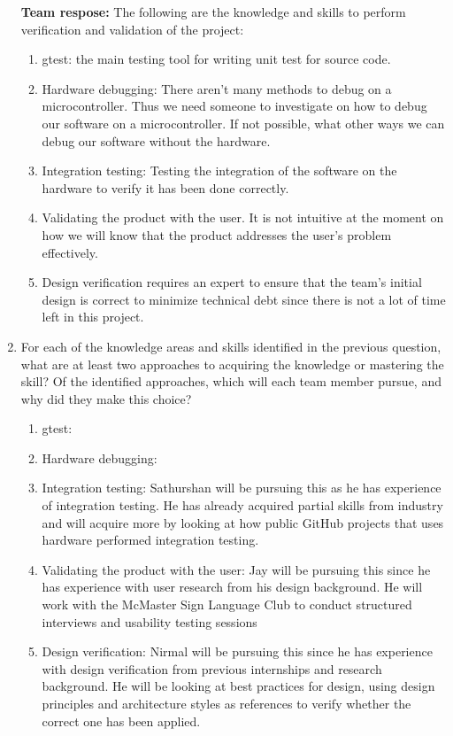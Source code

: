 \documentclass[12pt, titlepage]{article}
\begin{document}
\begin{enumerate}
  \textbf{Team respose:} The following are the knowledge and skills to perform
  verification and validation of the project:

  \begin{enumerate}
    \item gtest: the main testing tool for writing unit test for source code.
    \item Hardware debugging: There aren't many methods to debug on a
    microcontroller. Thus we need someone to investigate on how to debug our
    software on a microcontroller. If not possible, what other ways we can debug
    our software without the hardware.
    \item Integration testing: Testing the integration of the software on the
    hardware to verify it has been done correctly.
    \item Validating the product with the user. It is not intuitive at the
    moment on how we will know that the product addresses the user's problem
    effectively.
    \item Design verification requires an expert to ensure that the team's
    initial design is correct to minimize technical debt since there is not
    a lot of time left in this project.
  \end{enumerate}

  \item For each of the knowledge areas and skills identified in the previous
  question, what are at least two approaches to acquiring the knowledge or
  mastering the skill?  Of the identified approaches, which will each team
  member pursue, and why did they make this choice?

  \begin{enumerate}
    \item gtest:
    \item Hardware debugging: 
    \item Integration testing: Sathurshan will be pursuing this as he has
    experience of integration testing. He has already acquired partial skills
    from industry and will acquire more by looking at how public GitHub projects
    that uses hardware performed integration testing.
    \item Validating the product with the user: Jay will be pursuing this since he has experience 
    with user research from his design background. He will work with the McMaster Sign Language Club to 
    conduct structured interviews and usability testing sessions
    \item Design verification: Nirmal will be pursuing this since he has 
    experience with design verification from previous internships and research 
    background. He will be looking at best practices for design, using design 
    principles and architecture styles as references to verify whether the 
    correct one has been applied. 
  \end{enumerate}
\end{enumerate}
\end{document}
